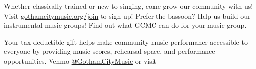 \documentclass{article}[10pt]
\begin{document}
\begin{center}
\begin{minipage}{4.2in}
            \begin{center}
            {\textbf{}}
            \end{center}

            \vspace{-0.1in}

            \begin{small}
                Whether classically trained or new to singing, come grow our community with us!
                Visit {\href{gothamcitymusic.org/join}{gothamcitymusic.org/join}} to sign up!
                Prefer the bassoon?
                Help us build our instrumental music groups!
                Find out what GCMC can do for your music group.
            \end{small}

            \begin{center}
            {\textbf{}}
            \end{center}

            \vspace{-0.1in}

            \begin{small}
                Your tax-deductible gift helps make community music performance accessible to everyone by providing
                music scores, rehearsal space, and performance opportunities.
                Venmo \href{https://account.venmo.com/u/GothamCityMusic}{@GothamCityMusic} or visit \textbf{}
            \end{small}


            \begin{center}
            {\textbf{}}
                \\


\end{center}
\end{minipage}
\end{center}
\end{document}
